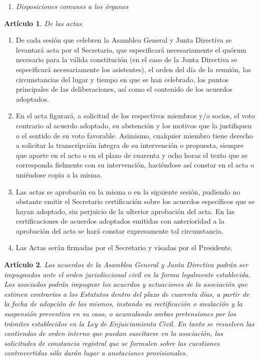 \documentclass[a4paper,12pt]{article}
\theoremstyle{mystyle}		%
\newtheorem{art}{Artículo}	%
\begin{document}
\begin{onehalfspace}
\begin{enumerate}[resume*=seccion]
 \item \textit{Disposiciones comunes a los órganos}
\end{enumerate}

\begin{art}
De las actas.
\end{art}
\begin{enumerate}[label={\arabic*.-}]
 \item De cada sesión que celebren la Asamblea General y Junta Directiva   se   levantará    acta   por el Secretario,  que  especificará necesariamente el quórum necesario para la válida constitución (en el caso de la Junta Directiva se especificará necesariamente los asistentes), el orden del día de la reunión, las circunstancias del lugar y tiempo en que se han celebrado, los puntos principales de las deliberaciones, así como el contenido de los acuerdos adoptados.
 \item En el acta figurará, a solicitud de los respectivos miembros y/o socios, el voto contrario al acuerdo adoptado, su abstención y los motivos que la justifiquen o el sentido de su voto favorable. Asimismo, cualquier miembro tiene derecho a solicitar la transcripción íntegra de su intervención o propuesta, siempre que aporte en el acto o en el plazo de cuarenta y ocho horas el texto que se corresponda fielmente con su intervención, haciéndose así constar en el acta o uniéndose copia a la misma.
 \item Las actas se aprobarán en la misma o en la siguiente sesión, pudiendo no obstante emitir el Secretario certificación sobre los acuerdos específicos que se hayan adoptado, sin perjuicio de la ulterior aprobación del acta. En las certificaciones de acuerdos adoptados emitidas con anterioridad a la aprobación del acta se hará constar expresamente tal circunstancia.
 \item Las Actas serán firmadas por el Secretario y visadas por el Presidente.
\end{enumerate}

\begin{art}
Los acuerdos de la Asamblea General y Junta Directiva podrán ser impugnados ante el orden jurisdiccional civil en la forma legalmente establecida. Los asociados podrán impugnar los acuerdos y actuaciones de la asociación que estimen contrarios a los Estatutos dentro del plazo de cuarenta días, a partir de la fecha de adopción de los mismos, instando su rectificación o anulación y la suspensión preventiva en su caso, o acumulando ambas pretensiones por los trámites establecidos en la Ley de Enjuiciamiento Civil. En tanto se resuelven las contiendas de orden interno que puedan suscitarse en la asociación, las solicitudes de constancia registral que se formulen sobre las cuestiones controvertidas sólo darán lugar a anotaciones provisionales.
\end{art}


\end{onehalfspace}
\end{document}
